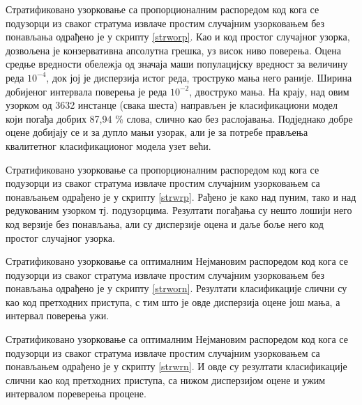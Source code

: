 \documentclass[a4paper]{article}
\begin{document}
Стратификовано узорковање са пропорционалним распоредом код кога се подузорци из сваког стратума извлаче простим случајним узорковањем без понављања одрађено је у скрипту \ref{strworp}. Као и код простог случајног узорка, дозвољена је конзервативна апсолутна грешка, уз висок ниво поверења. Оцена средње вредности обележја од значаја маши популацијску вредност за величину реда $10^{-4}$, док јој је дисперзија истог реда, троструко мања него раније. Ширина добијеног интервала поверења је реда $10^{-2}$, двоструко мања. На крају, над овим узорком од 3632 инстанце (свака шеста) направљен је класификациони модел који погађа добрих 87,94 \% слова, слично као без раслојавања. Подједнако добре оцене добијају се и за дупло мањи узорак, али је за потребе прављења квалитетног класификационог модела узет већи.



Стратификовано узорковање са пропорционалним распоредом код кога се подузорци из сваког стратума извлаче простим случајним узорковањем са понављањем одрађено је у скрипту \ref{strwrp}. Рађено је како над пуним, тако и над редукованим узорком тј. подузорцима. Резултати погађања су нешто лошији него код верзије без понављања, али су дисперзије оцена и даље боље него код простог случајног узорка.



Стратификовано узорковање са оптималним Нејмановим распоредом код кога се подузорци из сваког стратума извлаче простим случајним узорковањем без понављања одрађено је у скрипту \ref{strworn}. Резултати класификације слични су као код претходних приступа, с тим што је овде дисперзија оцене још мања, а интервал поверења ужи.



Стратификовано узорковање са оптималним Нејмановим распоредом код кога се подузорци из сваког стратума извлаче простим случајним узорковањем са понављањем одрађено је у скрипту \ref{strwrn}. И овде су резултати класификације слични као код претходних приступа, са нижом дисперзијом оцене и ужим интервалом пореверења процене.


\end{document}
